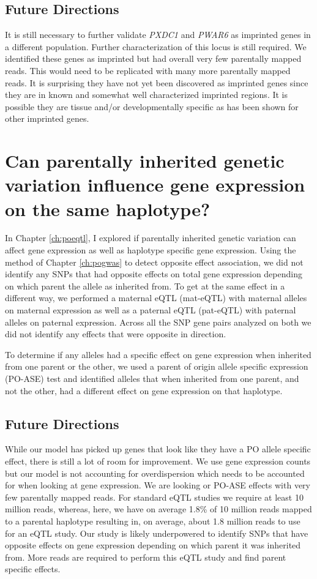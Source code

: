  \subsection{Future Directions}
It is still necessary to further validate \emph{PXDC1} and \emph{PWAR6} as imprinted genes in a different population. Further characterization of this locus is still required. We identified these genes as imprinted but had overall very few parentally mapped reads. This would need to be replicated with many more parentally mapped reads. It is surprising they have not yet been discovered as imprinted genes since they are in known and somewhat well characterized imprinted regions. It is possible they are tissue and/or developmentally specific as has been shown for other imprinted genes\cite{Baran:2015cx}. 

\section{Can parentally inherited genetic variation influence gene expression on the same haplotype?}

In Chapter \ref{ch:poeqtl}, I explored if parentally inherited genetic variation can affect gene expression as well as haplotype specific gene expression. Using the method of Chapter \ref{ch:pogwas} to detect opposite effect association, we did not identify any SNPs that had opposite effects on total gene expression depending on which parent the allele as inherited from. To get at the same effect in a different way, we performed a maternal eQTL (mat-eQTL) with maternal alleles on maternal expression as well as a paternal eQTL (pat-eQTL) with paternal alleles on paternal expression. Across all the SNP gene pairs analyzed on both we did not identify any effects that were opposite in direction. 

To determine if any alleles had a specific effect on gene expression when inherited from one parent or the other, we used a parent of origin allele specific expression (PO-ASE) test and identified alleles that when inherited from one parent, and not the other, had a different effect on gene expression on that haplotype. 


 \subsection{Future Directions}
 
 While our model has picked up genes that look like they have a PO allele specific effect, there is still a lot of room for improvement. We use gene expression counts but our model is not accounting for overdispersion which needs to be accounted for when looking at gene expression. We are looking or PO-ASE effects with very few parentally mapped reads. For standard eQTL studies we require at least 10 million reads, whereas, here, we have on average 1.8\% of 10 million reads mapped to a parental haplotype resulting in, on average, about 1.8 million reads to use for an eQTL study. Our study is likely underpowered to identify SNPs that have opposite effects on gene expression depending on which parent it was inherited from. More reads are required to perform this eQTL study and find parent specific effects. 
 
